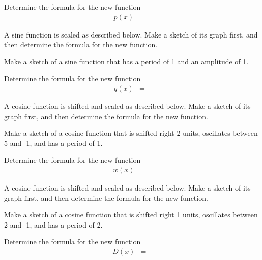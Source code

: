 \begin{problem}
\begin{subproblem}
    \item Determine the formula for the new function
      \begin{eqnarray*}
        p(x) & = & 
      \end{eqnarray*}
  \end{subproblem}

\clearpage

\item A sine function is scaled as described below. Make a sketch of
  its graph first, and then determine the formula for the new
  function.
  \begin{subproblem}
  \item Make a sketch of a sine function that has a period of 1 and an
    amplitude of 1.

  \item Determine the formula for the new function
    \begin{eqnarray*}
        q(x) & = & 
    \end{eqnarray*}
  \end{subproblem}

\item A cosine function is shifted and scaled as described
  below. Make a sketch of its graph first, and then determine the
  formula for the new function.
  \begin{subproblem}
  \item Make a sketch of a cosine function that is shifted right
    2 units, oscillates between 5 and -1, and has a period of 1.

    \item Determine the formula for the new function
      \begin{eqnarray*}
        w(x) & = & 
      \end{eqnarray*}
  \end{subproblem}

\clearpage

\item A cosine function is shifted and scaled as described
  below. Make a sketch of its graph first, and then determine the
  formula for the new function.
  \begin{subproblem}
  \item Make a sketch of a cosine function that is shifted right
    1 units, oscillates between 2 and -1, and has a period of 2.

    \item Determine the formula for the new function
      \begin{eqnarray*}
        D(x) & = & 
      \end{eqnarray*}
  \end{subproblem}


\end{problem}
